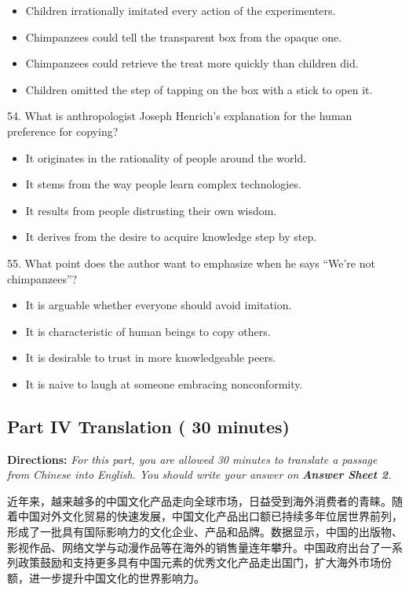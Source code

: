 \documentclass[UTF8,11pt]{ctexart}
\begin{document}
\begin{itemize}[leftmargin=2em,itemsep=.2em,topsep=.4em]\item[A.] Children irrationally imitated every action of the experimenters.
\item[B.] Chimpanzees could tell the transparent box from the opaque one.
\item[C.] Chimpanzees could retrieve the treat more quickly than children did.
\item[D.] Children omitted the step of tapping on the box with a stick to open it.
\end{itemize}

54. What is anthropologist Joseph Henrich’s explanation for the human preference for copying?


\begin{itemize}[leftmargin=2em,itemsep=.2em,topsep=.4em]\item[A.] It originates in the rationality of people around the world.
\item[B.] It stems from the way people learn complex technologies.
\item[C.] It results from people distrusting their own wisdom.
\item[D.] It derives from the desire to acquire knowledge step by step.
\end{itemize}

55. What point does the author want to emphasize when he says “We’re not chimpanzees”?


\begin{itemize}[leftmargin=2em,itemsep=.2em,topsep=.4em]\item[A.] It is arguable whether everyone should avoid imitation.
\item[B.] It is characteristic of human beings to copy others.
\item[C.] It is desirable to trust in more knowledgeable peers.
\item[D.] It is naive to laugh at someone embracing nonconformity.
\end{itemize}

\subsection*{\textbf{Part IV Translation} \textbf{( 30 minutes)}}


\textbf{Directions: }\textit{For this part, you are allowed 30 minutes to translate a passage from Chinese into English. You} \textit{should write your answer on }\textbf{\textit{Answer Sheet 2}}\textit{.}


近年来，越来越多的中国文化产品走向全球市场，日益受到海外消费者的青睐。随着中国对外文化贸易的快速发展，中国文化产品出口额已持续多年位居世界前列，形成了一批具有国际影响力的文化企业、产品和品牌。数据显示，中国的出版物、影视作品、网络文学与动漫作品等在海外的销售量连年攀升。中国政府出台了一系列政策鼓励和支持更多具有中国元素的优秀文化产品走出国门，扩大海外市场份额，进一步提升中国文化的世界影响力。
\end{document}
